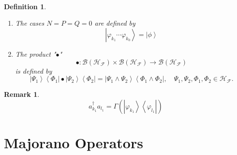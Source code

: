 \documentclass[aps,preprint]{revtex4}%
\newtheorem{definition}[theorem]{Definition}
\newtheorem{remark}[theorem]{Remark}
\begin{document}
\begin{definition}
\begin{enumerate}
\begin{enumerate}
\item $\left\vert \phi\right\rangle $ is a vacuum vector and
\begin{equation}
\mathcal{H}^{0}=\mathbb{C}\left\vert \phi\right\rangle .
\end{equation}

\end{enumerate}

\item The cases $N=P=Q=0$ are defined by
\begin{equation}
\left\vert \varphi_{k_{1}}\cdots\varphi_{k_{0}}\right\rangle =\left\vert
\phi\right\rangle
\end{equation}


\item The product "$\bullet$"
\begin{equation}
\bullet:\mathcal{B}\left(  \mathcal{H}_{\mathcal{F}}\right)  \times
\mathcal{B}\left(  \mathcal{H}_{\mathcal{F}}\right)  \rightarrow
\mathcal{B}\left(  \mathcal{H}_{\mathcal{F}}\right)
\end{equation}
is defined by
\begin{equation}
\left\vert \Psi_{1}\right\rangle \left\langle \Phi_{1}\right\vert
\bullet\left\vert \Psi_{2}\right\rangle \left\langle \Phi_{2}\right\vert
=\left\vert \Psi_{1}\wedge\Psi_{2}\right\rangle \left\langle \Phi_{1}%
\wedge\Phi_{2}\right\vert ,\quad\Psi_{1},\Psi_{2},\Phi_{1},\Phi_{2}%
\in\mathcal{H}_{\mathcal{F}}.
\end{equation}

\end{enumerate}
\end{definition}

\begin{remark}%
\begin{equation}
a_{k_{1}}^{\dagger}a_{l_{1}}=\Gamma\left(  \left\vert \varphi_{k_{1}%
}\right\rangle \left\langle \varphi_{l_{1}}\right\vert \right)
\end{equation}

\end{remark}

\section{Majorano Operators}
\end{document}
